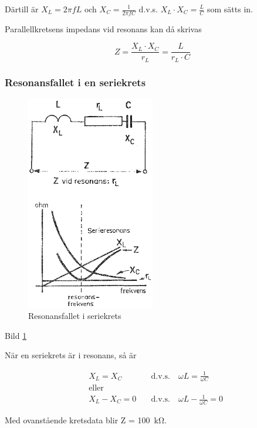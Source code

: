 Därtill är \(X_L = 2πfL\) och \(X_C = \frac{1}{2πfC}\) d.v.s.
\(X_L \cdot X_C = \frac{L}{C}\) som sätts in.

Parallellkretsens impedans vid resonans kan då skrivas

\[
Z = \frac{X_L \cdot X_C}{r_L} = \frac{L}{r_L \cdot C}
\]

\subsubsection{Resonansfallet i en seriekrets}
\label{serieresonans}

\begin{figure}
\includegraphics[width=0.5\textwidth]{images/bild_2_3-19.png}
\caption{Resonansfallet i seriekrets}
\label{fig:BildII3-19}
\end{figure}

Bild \ref{fig:BildII3-19}

När en seriekrets är i resonans, så är

\begin{align*}
& X_L = X_C \quad & \text{d.v.s.} \quad \omega L = \frac{1}{\omega C} \\
& \text{eller} & \\
& X_L - X_C = 0 \quad & \text{d.v.s.} \quad \omega L - \frac{1}{\omega C} = 0
\end{align*}

Med ovanstående kretsdata blir Z = 100~kΩ.

